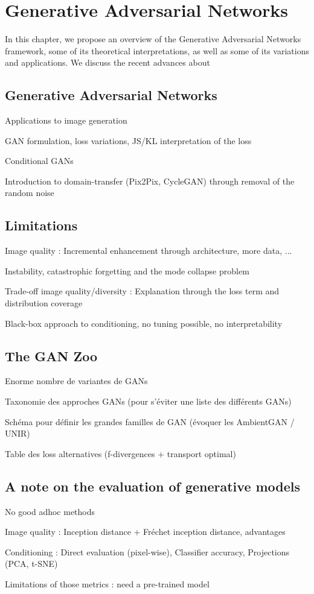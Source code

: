\chapter{Generative Adversarial Networks}
\label{chap:chapter1}

\begin{chapterabstract}
	In this chapter, we propose an overview	 of the Generative Adversarial Networks \cite{Goodfellow2014} framework, some of its theoretical interpretations, as well as some of its variations and applications. We discuss the recent advances about \GANs
\end{chapterabstract}

\section{Generative Adversarial Networks}
Applications to image generation

GAN formulation, loss variations, JS/KL interpretation of the loss

Conditional GANs

Introduction to domain-transfer (Pix2Pix, CycleGAN) through removal of the random noise

\section{Limitations}
Image quality : Incremental enhancement through architecture, more data, ... 

Instability, catastrophic forgetting and the mode collapse problem

Trade-off image quality/diversity : Explanation through the loss term and distribution coverage

Black-box approach to conditioning, no tuning possible, no interpretability

\section{The GAN Zoo}

Enorme nombre de variantes de GANs

Taxonomie des approches GANs (pour s'éviter une liste des différents GANs)

Schéma pour définir les grandes familles de GAN (évoquer les AmbientGAN / UNIR)

Table des loss alternatives (f-divergences + transport optimal)


\section{A note on the  evaluation of generative models}

No good adhoc methods

Image quality : Inception distance + Fréchet inception distance, advantages

Conditioning : Direct evaluation (pixel-wise), Classifier accuracy, Projections (PCA, t-SNE)

Limitations of those metrics : need a pre-trained model


